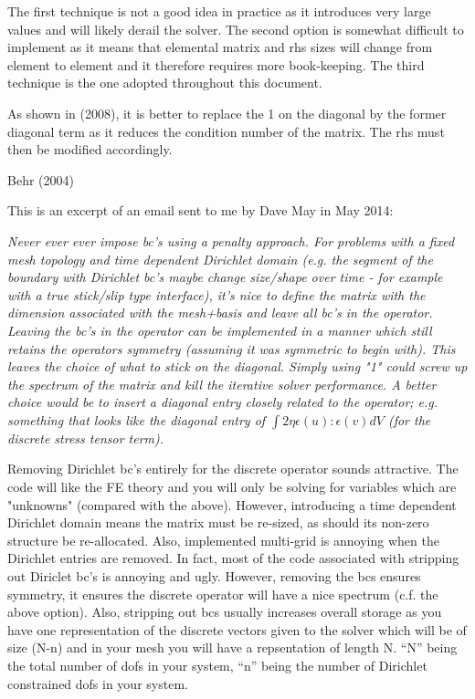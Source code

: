 The first technique is not a good idea in practice as it introduces very large 
values and will likely derail the solver. The second option is somewhat difficult
to implement as it means that elemental matrix and rhs sizes will change from 
element to element and it therefore requires more book-keeping.
The third technique is the one adopted throughout this document. 

As shown in \textcite{wuxl08} (2008), it is better to replace the 1 on the diagonal 
by the former diagonal term as it reduces the condition number of the matrix. 
The rhs must then be modified accordingly.

\Literature Behr (2004) \cite{behr04}

 This is an excerpt of an email sent to me by Dave May in May 2014: 
{\it 
Never ever ever impose bc's using a penalty approach.
For problems with a fixed mesh topology and time dependent Dirichlet domain (e.g. the segment 
of the boundary with Dirichlet bc's 
maybe change size/shape over time - for example with a true stick/slip type interface), it's nice to define the matrix 
with the dimension associated with the mesh+basis and leave all bc's in the operator. 
Leaving the bc's in the operator can be implemented in a manner which still retains the operators symmetry (assuming 
it was symmetric to begin with). This leaves the choice of what to stick on the diagonal. Simply using "1" could 
screw up the spectrum of the matrix and kill the iterative solver performance. A better choice would be to insert 
a diagonal entry closely related to the operator; e.g. something that looks like the diagonal entry 
of $\int 2 \eta \epsilon(u) : \epsilon(v) dV$ (for the discrete stress tensor term). 

Removing Dirichlet bc's entirely for the discrete operator sounds attractive. The code will like the FE theory 
and you will only be solving for variables which are "unknowns" (compared with the above). 
However, introducing a time dependent Dirichlet domain means the matrix must be re-sized, as should its non-zero structure 
be re-allocated. Also, implemented multi-grid is annoying when the Dirichlet entries are removed. In fact, most of  
the code associated with stripping out Diriclet bc's is annoying and ugly. However, removing the bcs ensures symmetry, 
it ensures the discrete operator will have a nice spectrum (c.f. the above option). Also, stripping out bcs usually 
increases overall storage as you have one representation of the discrete vectors given to the solver which will be  
of size (N-n) and in your mesh you will have a repsentation of length N. ``N'' being the total number of dofs in your 
system, ``n'' being the number of Dirichlet constrained dofs in your system. }
 

